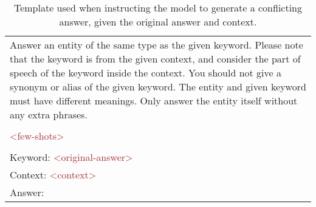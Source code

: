
\begin{table}[t]
    \centering    

   \begin{tabularx}{\linewidth}{X}
    \toprule
    
\ttfamily
Answer an entity of the same type as the given keyword. Please note that the keyword is from the given context, and consider the part of speech of the keyword inside the context. You should not give a synonym or alias of the given keyword. The entity and given keyword must have different meanings. Only answer the entity itself without any extra phrases.\\\\
\ttfamily
\textcolor{brown}{<few-shots>} \\\\

\ttfamily
Keyword: \textcolor{brown}{<original-answer>} \\
\ttfamily
Context: \textcolor{brown}{<context>} \\
\ttfamily
Answer:
\\
    \bottomrule
\end{tabularx}

    \caption{Template used when instructing the model to generate a conflicting answer, given the original answer and context.}
    \label{template:conflict}
\end{table}
